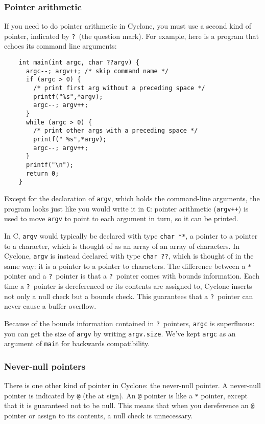 \subsubsection*{Pointer arithmetic}

If you need to do pointer arithmetic in Cyclone, you must use a second
kind of pointer, indicated by \texttt{?}\ (the question mark).  For
example, here is a program that echoes its command line arguments:
\begin{verbatim}
    int main(int argc, char ??argv) {
      argc--; argv++; /* skip command name */
      if (argc > 0) {
        /* print first arg without a preceding space */
        printf("%s",*argv);
        argc--; argv++;
      }
      while (argc > 0) {
        /* print other args with a preceding space */
        printf(" %s",*argv);
        argc--; argv++;
      }
      printf("\n");
      return 0;
    }
\end{verbatim}

Except for the declaration of \texttt{argv}, which holds the
command-line arguments, the program looks just like you would write it
in \texttt{C}: pointer arithmetic (\texttt{argv++}) is used to move
\texttt{argv} to point to each argument in turn, so it can be printed.

In C, \texttt{argv} would typically be declared with type \texttt{char
  **}, a pointer to a pointer to a character, which is thought of as
an array of an array of characters.  In Cyclone, \texttt{argv} is
instead declared with type \texttt{char ??}, which is thought of in
the same way: it is a pointer to a pointer to characters.  The
difference between a \texttt{*} pointer and a \texttt{?}\ pointer is
that a \texttt{?}\ pointer comes with bounds information.  Each time a
\texttt{?}\ pointer is dereferenced or its contents are assigned to,
Cyclone inserts not only a null check but a bounds check.  This
guarantees that a \texttt{?}\ pointer can never cause a buffer
overflow.

Because of the bounds information contained in \texttt{?}\ pointers,
\texttt{argc} is superfluous: you can get the size of \texttt{argv} by
writing \texttt{argv.size}.  We've kept \texttt{argc} as an argument
of \texttt{main} for backwards compatibility.

\subsubsection*{Never-null pointers}

There is one other kind of pointer in Cyclone: the never-null pointer.
A never-null pointer is indicated by \texttt{@} (the at sign).  An
\texttt{@} pointer is like a \texttt{*} pointer, except that it is
guaranteed not to be null.  This means that when you dereference an
\texttt{@} pointer or assign to its contents, a null check is
unnecessary.

